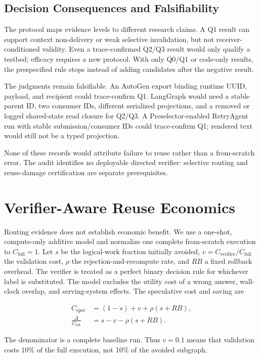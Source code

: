 \documentclass[letterpaper]{article} %
\begin{document}
\subsection{Decision Consequences and Falsifiability}

The protocol maps evidence levels to different research claims. A Q1 result
can support context non-delivery or weak selective invalidation, but not
receiver-conditioned validity. Even a trace-confirmed Q2/Q3 result would only
qualify a testbed; efficacy requires a new protocol. With only Q0/Q1 or
code-only results, the prespecified rule stops instead of adding candidates
after the negative result.

The judgments remain falsifiable. An AutoGen export binding runtime UUID,
payload, and recipient could trace-confirm Q1. LangGraph would need a stable
parent ID, two consumer IDs, different serialized projections, and a removed
or logged shared-state read closure for Q2/Q3. A Preselector-enabled RetryAgent
run with stable submission/consumer IDs could trace-confirm Q1; rendered text
would still not be a typed projection.

None of these records would attribute failure to reuse rather than a
from-scratch error. The audit identifies no deployable directed verifier:
selective routing and reuse-damage certification are separate prerequisites.

\section{Verifier-Aware Reuse Economics}

Routing evidence does not establish economic benefit. We use a one-shot,
compute-only additive model and normalize one complete from-scratch execution
to $C_{\mathrm{full}}=1$. Let $s$ be the logical-work fraction initially
avoided, $v=C_{\mathrm{verifier}}/C_{\mathrm{full}}$ the validation cost,
$\rho$ the rejection-and-recompute rate, and $RB$ a fixed rollback overhead.
The verifier is treated as a perfect binary decision rule for whichever label
is substituted. The model excludes the utility cost of a wrong answer,
wall-clock overlap, and serving-system effects. The speculative cost and saving
are

\begin{align}
C_{\mathrm{spec}} &= (1-s)+v+\rho(s+RB), \\
\frac{\Delta}{C_{\mathrm{full}}} &= s-v-\rho(s+RB).
\end{align}

The denominator is a complete baseline run. Thus $v=0.1$ means that validation
costs 10\% of the full execution, not 10\% of the avoided subgraph.
\end{document}
